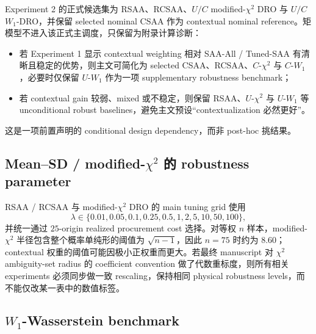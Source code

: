 \documentclass[11pt,a4paper]{ctexart}
\begin{document}
Experiment 2 的正式候选集为 RSAA、RCSAA、$U/C$ modified-$\chi^2$ DRO 与 $U/C$ $W_1$-DRO，并保留 selected nominal CSAA 作为 contextual nominal reference。矩模型不进入该正式主调度，只保留为附录计算诊断：
\begin{itemize}
\item 若 Experiment 1 显示 contextual weighting 相对 SAA-All / Tuned-SAA 有清晰且稳定的优势，则主文可简化为 selected CSAA、RCSAA、$C$-$\chi^2$ 与 $C$-$W_1$，必要时仅保留 $U$-$W_1$ 作为一项 supplementary robustness benchmark；
\item 若 contextual gain 较弱、mixed 或不稳定，则保留 RSAA、$U$-$\chi^2$ 与 $U$-$W_1$ 等 unconditional robust baselines，避免主文预设“contextualization 必然更好”。
\end{itemize}
这是一项前置声明的 conditional design dependency，而非 post-hoc 挑结果。

\subsection{Mean--SD / modified-$\chi^2$ 的 robustness parameter}

RSAA / RCSAA 与 modified-$\chi^2$ DRO 的 main tuning grid 使用
\[
\lambda\in\{0.01,0.05,0.1,0.25,0.5,1,2,5,10,50,100\},
\]
并统一通过 $25$-origin realized procurement cost 选择。对等权 $n$ 样本，modified-$\chi^2$ 半径包含整个概率单纯形的阈值为 $\sqrt{n-1}$，因此 $n=75$ 时约为 $8.60$；contextual 权重的阈值可能因极小正权重而更大。若最终 manuscript 对 $\chi^2$ ambiguity-set radius 的 coefficient convention 做了代数重标度，则所有相关 experiments 必须同步做一致 rescaling，保持相同 physical robustness levels，而不能仅改某一表中的数值标签。

\subsection{$W_1$-Wasserstein benchmark}
\end{document}
